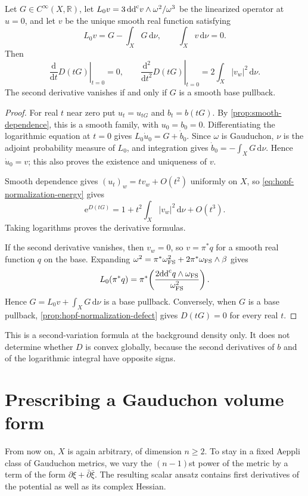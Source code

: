 \begin{corollary}\label{cor:hopf-normalization-hessian}
Let $G\in C^\infty(X,\mathbb R)$, let $L_0v=3\,\mathrm{dd}^{\mathrm{c}} v\wedge\omega^2/\omega^3$ be the linearized operator at $u=0$, and let $v$ be the unique smooth real function satisfying
\[
 L_0v=G-\int_XG\,\mathrm{d}\nu,
 \qquad \int_Xv\,\mathrm{d}\nu=0.
\]
Then
\[
 \left.\frac{\mathrm{d}}{\mathrm{d}t}D(tG)\right|_{t=0}=0,
 \qquad
 \left.\frac{\mathrm{d}^2}{\mathrm{d}t^2}D(tG)\right|_{t=0}
       =2\int_X|v_w|^2\,\mathrm{d}\nu.
\]
The second derivative vanishes if and only if $G$ is a smooth base pullback.
\end{corollary}
\begin{proof}
For real $t$ near zero put $u_t=u_{tG}$ and $b_t=b(tG)$. By \cref{prop:smooth-dependence}, this is a smooth family, with $u_0=b_0=0$. Differentiating the logarithmic equation at $t=0$ gives $L_0\dot u_0=G+\dot b_0$. Since $\omega$ is Gauduchon, $\nu$ is the adjoint probability measure of $L_0$, and integration gives $\dot b_0=-\int_XG\,\mathrm{d}\nu$. Hence $\dot u_0=v$; this also proves the existence and uniqueness of $v$.

Smooth dependence gives $(u_t)_w=t v_w+O(t^2)$ uniformly on $X$, so \eqref{eq:hopf-normalization-energy} gives
\[
 \mathrm{e}^{D(tG)}=1+t^2\int_X|v_w|^2\,\mathrm{d}\nu+O(t^3).
\]
Taking logarithms proves the derivative formulas.

If the second derivative vanishes, then $v_w=0$, so $v=\pi^*q$ for a smooth real function $q$ on the base. Expanding $\omega^2=\pi^*\omega_{\mathrm{FS}}^2+2\pi^*\omega_{\mathrm{FS}}\wedge\beta$ gives
\[
 L_0(\pi^*q)=\pi^*\!\left(
       \frac{2\mathrm{dd}^{\mathrm{c}} q\wedge\omega_{\mathrm{FS}}}{\omega_{\mathrm{FS}}^2}\right).
\]
Hence $G=L_0v+\int_XG\,\mathrm{d}\nu$ is a base pullback. Conversely, when $G$ is a base pullback, \cref{prop:hopf-normalization-defect} gives $D(tG)=0$ for every real $t$.
\end{proof}

This is a second-variation formula at the background density only. It does not determine whether $D$ is convex globally, because the second derivatives of $b$ and of the logarithmic integral have opposite signs.

\section{Prescribing a Gauduchon volume form}

From now on, $X$ is again arbitrary, of dimension $n\geq2$. To stay in a fixed Aeppli class of Gauduchon metrics, we vary the $(n-1)$st power of the metric by a term of the form $\partial\xi+\bar\partial\bar\xi$. The resulting scalar ansatz contains first derivatives of the potential as well as its complex Hessian.

